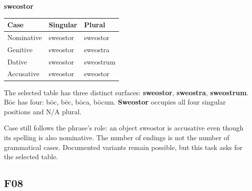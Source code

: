 \par\begin{minipage}{\linewidth}\raggedright
\textbf{sweostor}

\par\begingroup
\fontsize{10.5}{13.2}\selectfont
\setlength{\LTleft}{0pt}\setlength{\LTright}{\fill}
\noindent
\begin{tabular}{@{}>{\raggedright\arraybackslash}p{39.46mm}>{\raggedright\arraybackslash}p{39.46mm}>{\raggedright\arraybackslash}p{39.46mm}@{}}
\toprule
\textbf{Case} & \textbf{Singular} & \textbf{Plural} \\
\midrule
Nominative & sweostor & sweostor \\
Genitive & sweostor & sweostra \\
Dative & sweostor & sweostrum \\
Accusative & sweostor & sweostor \\
\bottomrule
\end{tabular}
\par\endgroup

The selected table has three distinct surfaces: \textbf{sweostor}, \textbf{sweostra}, \textbf{sweostrum}. Bōc has four: bōc, bēc, bōca, bōcum. \textbf{Sweostor} occupies all four singular positions and N/\allowbreak{}A plural.

Case still follows the phrase’s role: an object sweostor is accusative even though its spelling is also nominative. The number of endings is not the number of grammatical cases. Documented variants remain possible, but this task asks for the selected table.

\end{minipage}\par\addvspace{4pt}

\subsection*{F08}

